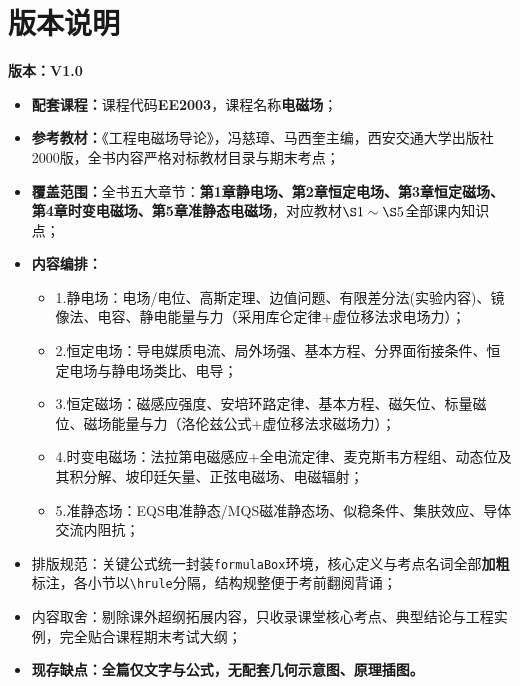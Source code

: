 \section*{版本说明}
\noindent\textbf{版本：V1.0}
\begin{itemize}
    \item \textbf{配套课程：}课程代码\textbf{EE2003}，课程名称\textbf{电磁场}；
    \item \textbf{参考教材：}《工程电磁场导论》，冯慈璋、马西奎主编，西安交通大学出版社2000版，全书内容严格对标教材目录与期末考点；
    \item \textbf{覆盖范围：}全书五大章节：\textbf{第1章静电场、第2章恒定电场、第3章恒定磁场、第4章时变电磁场、第5章准静态电磁场}，对应教材$\S1\sim\S5$全部课内知识点；
    \item \textbf{内容编排：}
    \begin{itemize}
        \item 1.静电场：电场/电位、高斯定理、边值问题、有限差分法(实验内容)、镜像法、电容、静电能量与力（采用库仑定律+虚位移法求电场力）；
        \item 2.恒定电场：导电媒质电流、局外场强、基本方程、分界面衔接条件、恒定电场与静电场类比、电导；
        \item 3.恒定磁场：磁感应强度、安培环路定律、基本方程、磁矢位、标量磁位、磁场能量与力（洛伦兹公式+虚位移法求磁场力）；
        \item 4.时变电磁场：法拉第电磁感应+全电流定律、麦克斯韦方程组、动态位及其积分解、坡印廷矢量、正弦电磁场、电磁辐射；
        \item 5.准静态场：EQS电准静态/MQS磁准静态场、似稳条件、集肤效应、导体交流内阻抗；
    \end{itemize}
    \item 排版规范：关键公式统一封装\verb|formulaBox|环境，核心定义与考点名词全部\textbf{加粗}标注，各小节以\verb|\hrule|分隔，结构规整便于考前翻阅背诵；
    \item 内容取舍：剔除课外超纲拓展内容，只收录课堂核心考点、典型结论与工程实例，完全贴合课程期末考试大纲；
    \item \textbf{现存缺点：全篇仅文字与公式，无配套几何示意图、原理插图。}
\end{itemize}